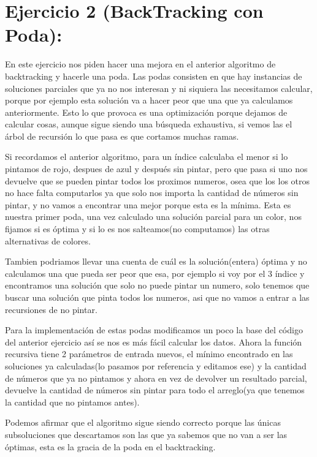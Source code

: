 \section{Ejercicio 2 (BackTracking con Poda):}

En este ejercicio nos piden hacer una mejora en el anterior algoritmo de backtracking y hacerle una poda. Las podas consisten en que hay instancias de soluciones parciales que ya no nos interesan y ni siquiera las necesitamos calcular, porque por ejemplo esta solución va a hacer peor que una que ya calculamos anteriormente. Esto lo que provoca es una optimización porque dejamos de calcular cosas, aunque sigue siendo una búsqueda exhaustiva, si vemos las el árbol de recursión lo que pasa es que cortamos muchas ramas.

Si recordamos el anterior algoritmo, para un índice calculaba el menor si lo pintamos de rojo, despues de azul y después sin pintar, pero que pasa si uno nos devuelve que se pueden pintar todos los proximos numeros, osea que los los otros no hace falta computarlos ya que solo nos importa la cantidad de números sin pintar, y no vamos a encontrar una mejor porque esta es la mínima. Esta es nuestra primer poda, una vez calculado una solución parcial para un color, nos fijamos si es óptima y si lo es nos salteamos(no computamos) las otras alternativas de colores.	

Tambien podriamos llevar una cuenta de cuál es la solución(entera) óptima y no calculamos una que pueda ser peor que esa, por ejemplo si voy por el 3 índice y encontramos una solución que solo no puede pintar un numero, solo tenemos que buscar una solución que pinta todos los numeros, asi que no vamos a entrar a las recursiones de no pintar.

Para la implementación de estas podas modificamos un poco la base del código del anterior ejercicio así se nos es más fácil calcular los datos. Ahora la función recursiva tiene 2 parámetros de entrada nuevos, el mínimo encontrado en las soluciones ya calculadas(lo pasamos por referencia y editamos ese) y la cantidad de números que ya no pintamos y ahora en vez de devolver un resultado parcial, devuelve la cantidad de  números sin pintar para todo el arreglo(ya que tenemos la cantidad que no pintamos antes).

Podemos afirmar que el algoritmo sigue siendo correcto porque las únicas subsoluciones que descartamos son las que ya sabemos que no van a ser las óptimas, esta es la gracia de la poda en el backtracking.

